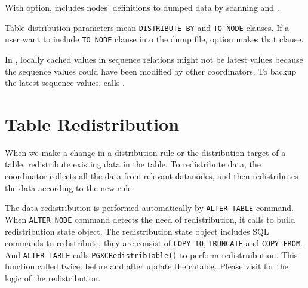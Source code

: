   With  option,  includes nodes' definitions to
  dumped data by scanning  and .
  
  Table distribution parameters mean \texttt{DISTRIBUTE BY} and \texttt{TO NODE} clauses.
  If a user want to include \texttt{TO NODE} clause into the dump file, 
  option makes that clause.
  
  In \XC, locally cached values in sequence relations might not be latest values because
  the sequence values could have been modified by other coordinators.
  To backup the latest sequence values,
   calls .

\section{\label{sec:redistrib}Table Redistribution}

  When we make a change in a distribution rule or the distribution target of a table,
  \XC{} redistribute existing data in the table.
  To redistribute data, the coordinator collects all the data from relevant datanodes,
  and then redistributes the data according to the new rule.
  
  The data redistribution is performed automatically by \texttt{ALTER TABLE} command.
  When \texttt{ALTER NODE} command detects the need of redistribution, it calls 
  to build redistribution state object.
  The redistribution state object includes SQL commands to redistribute,
  they are consist of \texttt{COPY TO}, \texttt{TRUNCATE} and \texttt{COPY FROM}.
  And \texttt{ALTER TABLE} calls \texttt{PGXCRedistribTable()} to  perform redistruibution.
  This function called twice: before and after update the catalog.
  Please visit  for the logic of the redistribution.
